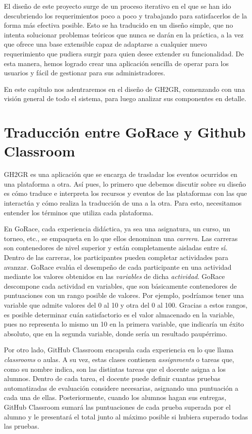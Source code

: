 El diseño de este proyecto surge de un proceso iterativo en el que se han ido descubriendo los requerimientos poco a poco y trabajando para satisfacerlos de la forma más efectiva posible. Esto se ha traducido en un diseño simple, que no intenta solucionar problemas teóricos que nunca se darán en la práctica, a la vez que ofrece una base extensible capaz de adaptarse a cualquier nuevo requerimiento que pudiera surgir para quien desee extender su funcionalidad. De esta manera, hemos logrado crear una aplicación sencilla de operar para los usuarios y fácil de gestionar para sus administradores.

En este capítulo nos adentraremos en el diseño de GH2GR, comenzando con una visión general de todo el sistema, para luego analizar sus componentes en detalle.
\section{Traducción entre GoRace y Github Classroom} \label{title:mapping-gorace-gh}
GH2GR es una aplicación que se encarga de trasladar los eventos ocurridos en una plataforma a otra. Así pues, lo primero que debemos discutir sobre su diseño es cómo traduce e interpreta los recursos y eventos de las plataformas con las que interactúa y cómo realiza la traducción de una a la otra. Para esto, necesitamos entender los términos que utiliza cada plataforma.

En GoRace, cada experiencia didáctica, ya sea una asignatura, un curso, un torneo, etc., se empaqueta en lo que ellos denominan una {\it carrera}. Las carreras son contenedores de nivel superior y están completamente aisladas entre sí. Dentro de las carreras, los participantes pueden completar actividades para avanzar. GoRace evalúa el desempeño de cada participante en una actividad mediante los valores obtenidos en las {\it variables} de dicha {\it actividad}. GoRace descompone cada actividad en variables, que son básicamente contenedores de puntuaciones con un rango posible de valores. Por ejemplo, podríamos tener una variable que admite valores del 0 al 10 y otra del 0 al 100. Gracias a estos rangos, es posible determinar cuán satisfactorio es el valor almacenado en la variable, pues no representa lo mismo un 10 en la primera variable, que indicaría un éxito absoluto, que en la segunda variable, donde sería un resultado paupérrimo.

Por otro lado, GitHub Classroom encapsula cada experiencia en lo que llama \textit{classrooms} o aulas. A su vez, estas clases contienen \textit{assignments} o tareas que, como su nombre indica, son las distintas tareas que el docente asigna a los alumnos. Dentro de cada tarea, el docente puede definir cuantas pruebas automatizadas de evaluación considere necesarias, asignando una puntuación a cada una de ellas. Posteriormente, cuando los alumnos hagan sus entregas, GitHub Classroom sumará las puntuaciones de cada prueba superada por el alumno y le presentará el total junto al máximo posible si hubiera superado todas las pruebas.

